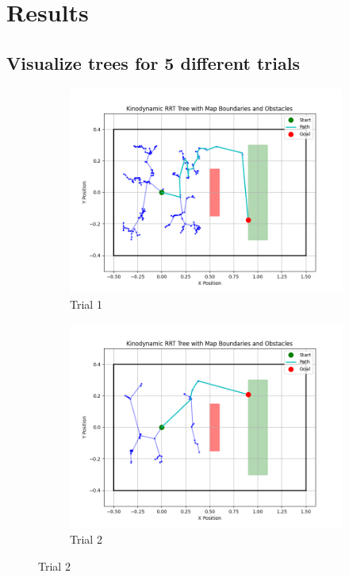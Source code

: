 \documentclass[12pt]{article}
\begin{document}
\section{Results}

\subsection{Visualize trees for 5 different trials}

\begin{figure}[h!]
    \centering
    \begin{subfigure}{0.45\textwidth}
        \centering
        \includegraphics[width=\textwidth]{./images/tree1.png}
        \caption{Trial 1}
        \label{fig:tree_1}
    \end{subfigure}
    \hfill
    \begin{subfigure}{0.45\textwidth}
        \centering
        \includegraphics[width=\textwidth]{./images/tree2.png}
        \caption{Trial 2}
        \label{fig:tree_2}
    \end{subfigure}
    

\end{figure}
\end{document}
